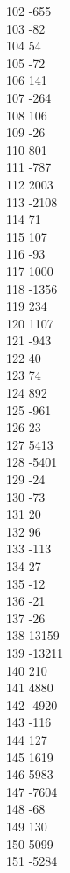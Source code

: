 { 102	-655 \\
 103	-82 \\
 104	54 \\
 105	-72 \\
 106	141 \\
 107	-264 \\
 108	106 \\
 109	-26 \\
 110	801 \\
 111	-787 \\
 112	2003 \\
 113	-2108 \\
 114	71 \\
 115	107 \\
 116	-93 \\
 117	1000 \\
 118	-1356 \\
 119	234 \\
 120	1107 \\
 121	-943 \\
 122	40 \\
 123	74 \\
 124	892 \\
 125	-961 \\
 126	23 \\
 127	5413 \\
 128	-5401 \\
 129	-24 \\
 130	-73 \\
 131	20 \\
 132	96 \\
 133	-113 \\
 134	27 \\
 135	-12 \\
 136	-21 \\
 137	-26 \\
 138	13159 \\
 139	-13211 \\
 140	210 \\
 141	4880 \\
 142	-4920 \\
 143	-116 \\
 144	127 \\
 145	1619 \\
 146	5983 \\
 147	-7604 \\
 148	-68 \\
 149	130 \\
 150	5099 \\
 151	-5284 \\
}
